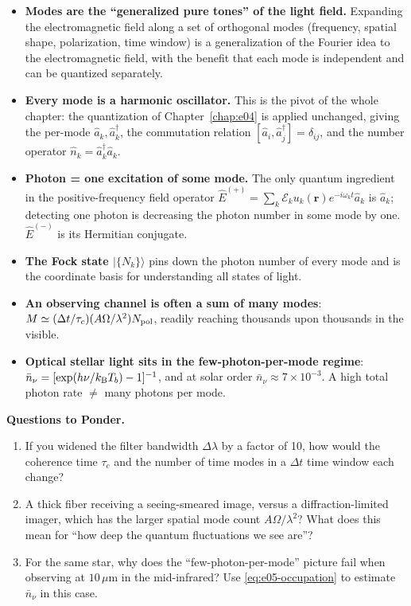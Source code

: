 \begin{itemize}
  \item \textbf{Modes are the ``generalized pure tones'' of the light field.} Expanding the electromagnetic field along a set of orthogonal modes (frequency, spatial shape, polarization, time window) is a generalization of the Fourier idea to the electromagnetic field, with the benefit that each mode is independent and can be quantized separately.
  \item \textbf{Every mode is a harmonic oscillator.} This is the pivot of the whole chapter: the quantization of Chapter~\ref{chap:e04} is applied unchanged, giving the per-mode \(\hat a_k,\hat a_k^\dagger\), the commutation relation \([\hat a_i,\hat a_j^\dagger]=\delta_{ij}\), and the number operator \(\hat n_k=\hat a_k^\dagger\hat a_k\).
  \item \textbf{Photon = one excitation of some mode.} The only quantum ingredient in the positive-frequency field operator \(\hat E^{(+)}=\sum_k\mathcal E_k u_k(\bm r)e^{-i\omega_k t}\hat a_k\) is \(\hat a_k\); detecting one photon is decreasing the photon number in some mode by one. \(\hat E^{(-)}\) is its Hermitian conjugate.
  \item \textbf{The Fock state \(|\{N_k\}\rangle\)} pins down the photon number of every mode and is the coordinate basis for understanding all states of light.
  \item \textbf{An observing channel is often a sum of many modes}: \(M\simeq(\Delta t/\tau_c)(A\Omega/\lambda^2)N_{\rm pol}\), readily reaching thousands upon thousands in the visible.
  \item \textbf{Optical stellar light sits in the few-photon-per-mode regime}: \(\bar n_\nu=[\exp(h\nu/k_{\rm B}T_b)-1]^{-1}\), and at solar order \(\bar n_\nu\approx7\times10^{-3}\). A high total photon rate \(\neq\) many photons per mode.
\end{itemize}

\medskip
\noindent\textbf{Questions to Ponder.}
\begin{enumerate}
  \item If you widened the filter bandwidth \(\Delta\lambda\) by a factor of 10, how would the coherence time \(\tau_c\) and the number of time modes in a \(\Delta t\) time window each change?
  \item A thick fiber receiving a seeing-smeared image, versus a diffraction-limited imager, which has the larger spatial mode count \(A\Omega/\lambda^2\)? What does this mean for ``how deep the quantum fluctuations we see are''?
  \item For the same star, why does the ``few-photon-per-mode'' picture fail when observing at \(10\,\mu\mathrm{m}\) in the mid-infrared? Use \eqref{eq:e05-occupation} to estimate \(\bar n_\nu\) in this case.
\end{enumerate}
